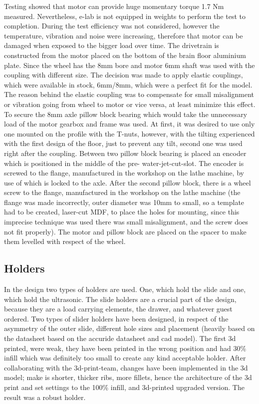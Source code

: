 \documentclass[11pt]{article}
\begin{document}
Testing showed that motor can provide huge momentary torque 1.7 Nm measured. Nevertheless, e-lab is not equipped in weights to perform the test to completion. During the test efficiency was not considered, however the temperature, vibration and noise were increasing, therefore that motor can be damaged when exposed to the bigger load over time.  
The drivetrain is constructed from the motor placed on the bottom of the brain floor aluminium plate. Since the wheel has the 8mm bore and motor 6mm shaft was used with the coupling with different size. The decision was made to apply elastic couplings, which were available in stock, 6mm/8mm, which were a perfect fit for the model. The reason behind the elastic coupling was to compensate for small misalignment or vibration going from wheel to motor or vice versa, at least minimize this effect. To secure the 8mm axle pillow block bearing which would take the unnecessary load of the motor gearbox and frame was used. At first, it was desired to use only one mounted on the profile with the T-nuts, however, with the tilting experienced with the first design of the floor, just to prevent any tilt, second one was used right after the coupling. Between two pillow block bearing is placed an encoder which is positioned in the middle of the pre- water-jet-cut-slot. The encoder is screwed to the flange, manufactured in the workshop on the lathe machine, by use of which is locked to the axle. After the second pillow block, there is a wheel screw to the flange, manufactured in the workshop on the lathe machine (the flange was made incorrectly, outer diameter was 10mm to small, so a template had to be created, laser-cut MDF, to place the holes for mounting, since this imprecise technique was used there was small misalignment, and the screw does not fit properly). The motor and pillow block are placed on the spacer to make them levelled with respect of the wheel.


\subsection*{Holders}
In the design two types of holders are used. One, which hold the slide and one, which hold the ultrasonic. The slide holders are a crucial part of the design, because they are a load carrying elements, the drawer, and whatever guest ordered. Two types of slider holders have been designed, in respect of the asymmetry of the outer slide, different hole sizes and placement (heavily based on the datasheet based on the accuride datasheet and cad model). The first 3d printed, were weak, they have been printed in the wrong position and had 30\% infill which was definitely too small to create any kind acceptable holder. After collaborating with the 3d-print-team, changes have been implemented in the 3d model; make is shorter, thicker ribs, more fillets, hence the architecture of the 3d print and set settings to the 100\% infill, and 3d-printed upgraded version. The result was a robust holder.
\end{document}
